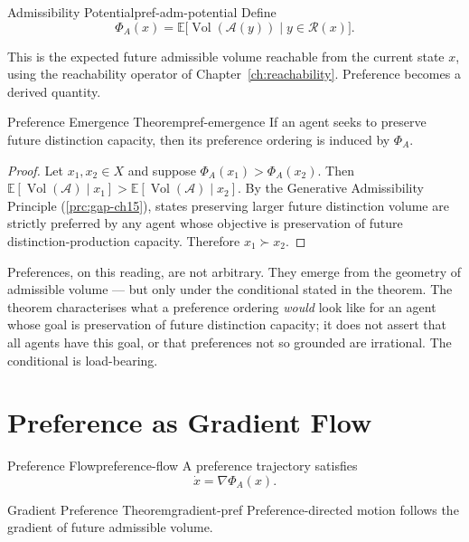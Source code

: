 \documentclass[12pt,twoside,openright]{book}
\newcommand{\reach}{\mathcal{R}}
\newcommand{\adm}{\mathcal{A}}
\newcommand{\Vol}{\operatorname{Vol}}
\begin{document}
\begin{definition}{Admissibility Potential}{pref-adm-potential}
  Define
  \[
    \Phi_A(x)
    = \mathbb{E}\bigl[
        \Vol(\adm(y)) \mid y \in \reach(x)
      \bigr].
  \]
\end{definition}

This is the expected future admissible volume reachable
from the current state $x$, using the reachability operator
of Chapter~\ref{ch:reachability}. Preference becomes a
derived quantity.

\begin{theorem}{Preference Emergence Theorem}{pref-emergence}
  If an agent seeks to preserve future distinction capacity,
  then its preference ordering is induced by $\Phi_A$.
\end{theorem}

\begin{proof}
  Let $x_1, x_2 \in X$ and suppose
  $\Phi_A(x_1) > \Phi_A(x_2)$. Then
  $\mathbb{E}[\Vol(\adm) \mid x_1] > \mathbb{E}[\Vol(\adm) \mid x_2]$.
  By the Generative Admissibility Principle
  (\cref{prc:gap-ch15}), states preserving larger future
  distinction volume are strictly preferred by any agent
  whose objective is preservation of future
  distinction-production capacity. Therefore $x_1 \succ x_2$.
\end{proof}

Preferences, on this reading, are not arbitrary. They
emerge from the geometry of admissible volume --- but only
under the conditional stated in the theorem. The theorem
characterises what a preference ordering \emph{would}
look like for an agent whose goal is preservation of
future distinction capacity; it does not assert that all
agents have this goal, or that preferences not so grounded
are irrational. The conditional is load-bearing.

\section{Preference as Gradient Flow}
\label{sec:ch22-gradient}

\begin{definition}{Preference Flow}{preference-flow}
  A preference trajectory satisfies
  \[
    \dot{x} = \nabla\Phi_A(x).
  \]
\end{definition}

\begin{theorem}{Gradient Preference Theorem}{gradient-pref}
  Preference-directed motion follows the gradient of future
  admissible volume.
\end{theorem}
\end{document}
